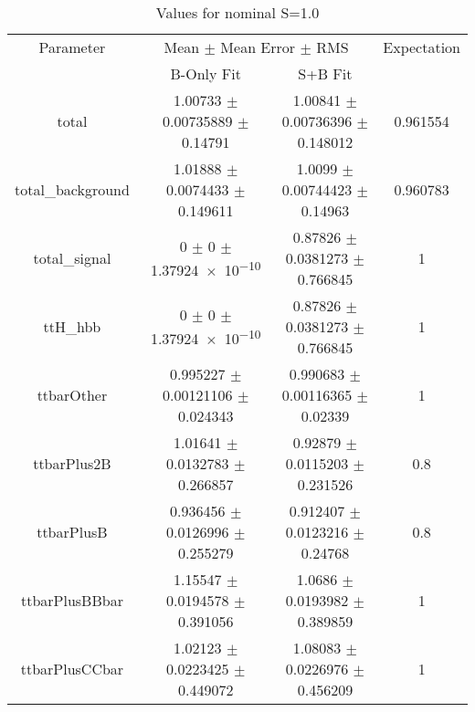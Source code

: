 \begin{table}
\centering
\caption{Values for nominal S=1.0}
\begin{tabular}{cccc}
\toprule
Parameter & \multicolumn{2}{c}{Mean $\pm$ Mean Error $\pm$ RMS} & Expectation\\
 & B-Only Fit & S+B Fit & \\
\midrule
total & \num{1.00733} $\pm$ \num{0.00735889} $\pm$ \num{0.14791} & \num{1.00841} $\pm$ \num{0.00736396} $\pm$ \num{0.148012} & \num{0.961554}\\
total\_background & \num{1.01888} $\pm$ \num{0.0074433} $\pm$ \num{0.149611} & \num{1.0099} $\pm$ \num{0.00744423} $\pm$ \num{0.14963} & \num{0.960783}\\
total\_signal & \num{0} $\pm$ \num{0} $\pm$ \num{1.37924e-10} & \num{0.87826} $\pm$ \num{0.0381273} $\pm$ \num{0.766845} & \num{1}\\
ttH\_hbb & \num{0} $\pm$ \num{0} $\pm$ \num{1.37924e-10} & \num{0.87826} $\pm$ \num{0.0381273} $\pm$ \num{0.766845} & \num{1}\\
ttbarOther & \num{0.995227} $\pm$ \num{0.00121106} $\pm$ \num{0.024343} & \num{0.990683} $\pm$ \num{0.00116365} $\pm$ \num{0.02339} & \num{1}\\
ttbarPlus2B & \num{1.01641} $\pm$ \num{0.0132783} $\pm$ \num{0.266857} & \num{0.92879} $\pm$ \num{0.0115203} $\pm$ \num{0.231526} & \num{0.8}\\
ttbarPlusB & \num{0.936456} $\pm$ \num{0.0126996} $\pm$ \num{0.255279} & \num{0.912407} $\pm$ \num{0.0123216} $\pm$ \num{0.24768} & \num{0.8}\\
ttbarPlusBBbar & \num{1.15547} $\pm$ \num{0.0194578} $\pm$ \num{0.391056} & \num{1.0686} $\pm$ \num{0.0193982} $\pm$ \num{0.389859} & \num{1}\\
ttbarPlusCCbar & \num{1.02123} $\pm$ \num{0.0223425} $\pm$ \num{0.449072} & \num{1.08083} $\pm$ \num{0.0226976} $\pm$ \num{0.456209} & \num{1}\\
\bottomrule
\end{tabular}
\end{table}